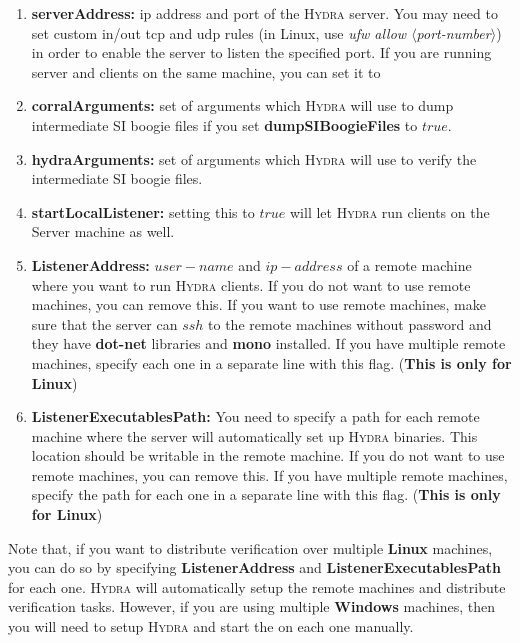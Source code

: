 \documentclass{article}
\begin{document}
\begin{enumerate}
  \item \textbf{serverAddress:} ip address and port of the \textsc{Hydra} server. You may need to set custom in/out tcp and udp rules (in Linux, use \textit{ufw allow $\langle$port-number$\rangle$}) in order to enable the server to listen the specified port. If you are running server and clients on the same machine, you can set it to 
  \item \textbf{corralArguments:} set of arguments which \textsc{Hydra} will use to dump intermediate SI boogie files if you set \textbf{dumpSIBoogieFiles} to $true$.
  \item \textbf{hydraArguments:} set of arguments which \textsc{Hydra} will use to verify the intermediate SI boogie files.
  \item \textbf{startLocalListener:} setting this to $true$ will let \textsc{Hydra} run clients on the Server machine as well.
  \item \textbf{ListenerAddress:} $user-name$ and $ip-address$ of a remote machine where you want to run \textsc{Hydra} clients. If you do not want to use remote machines, you can remove this. If you want to use remote machines, make sure that the server can $ssh$ to the remote machines without password and they have \textbf{dot-net} libraries and \textbf{mono} installed. If you have multiple remote machines, specify each one in a separate line with this flag. (\textbf{This is only for Linux})
  \item \textbf{ListenerExecutablesPath:} You need to specify a path for each remote machine where the server will automatically set up \textsc{Hydra} binaries. This location should be writable in the remote machine. If you do not want to use remote machines, you can remove this. If you have multiple remote machines, specify the path for each one in a separate line with this flag. (\textbf{This is only for Linux})
\end{enumerate}
\par
\noindent
Note that, if you want to distribute verification over multiple \textbf{Linux} machines, you can do so by specifying \textbf{ListenerAddress} and \textbf{ListenerExecutablesPath} for each one. \textsc{Hydra} will automatically setup the remote machines and distribute verification tasks. However, if you are using multiple \textbf{Windows} machines, then you will need to setup \textsc{Hydra} and start the  on each one manually.
\end{document}
